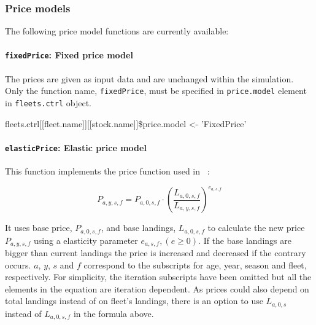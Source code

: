 \subsubsection{Price models}

  The following price model functions are currently available:
  
\paragraph{\texttt{fixedPrice}: Fixed price model} \hspace{0pt} \smallskip

The prices are given as input data and are unchanged within the simulation.
Only the function name, \texttt{fixedPrice},  must be specified in  \texttt{price.model} element in \texttt{fleets.ctrl}
object.

\begin{Sinput}
	fleets.ctrl[[fleet.name]][[stock.name]]\$price.model <- 'FixedPrice'
\end{Sinput}


\paragraph{\texttt{elasticPrice}: Elastic price model} \hspace{0pt} \smallskip

This function implements the price function used in ~\cite{Kraak2004}:

	\begin{equation}\label{eq:elasticPrice}
		P_{a,y,s,f} = P_{a,0,s,f} \cdot \left( \frac{L_{a,0,s,f}}{L_{a,y,s,f}}\right)^{e_{a,s,f}} 
	\end{equation}
	
\noindent It uses base price, $P_{a,0,s,f}$,
and  base landings, $L_{a,0,s,f}$ to calculate the new price $P_{a,y,s,f}$ using a elasticity parameter $e_{a,s,f}, (e\geq0)$. 
If the base landings are bigger than current landings the price is increased and decreased if the contrary occurs.
$a$, $y$, $s$ and $f$ correspond to the subscripts for age, year, season and fleet, respectively. 
For simplicity, the iteration subscripts have been omitted but all the elements in the equation are iteration dependent.
As prices could also depend on total landings instead of on fleet's landings, there is an option to use  
$L_{a,0,s}$ instead of $L_{a,0,s,f}$ in the formula above.

